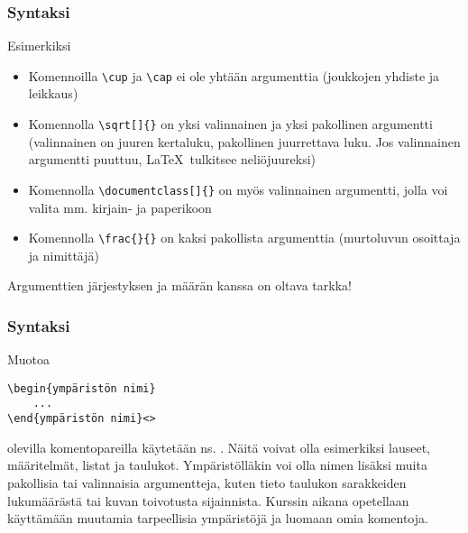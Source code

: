 \begin{fframe}
    \frametitle{Syntaksi}
    Esimerkiksi 
    \begin{itemize}[<+->]
        \item Komennoilla \lstinline-\cup- ja \lstinline-\cap- ei ole yhtään argumenttia (joukkojen yhdiste ja leikkaus)
        \item Komennolla \lstinline-\sqrt[]{}- on yksi valinnainen ja yksi pakollinen argumentti (valinnainen on juuren kertaluku, pakollinen juurrettava luku. Jos valinnainen argumentti puuttuu, \LaTeX\ tulkitsee neliöjuureksi)
        \item Komennolla \lstinline-\documentclass[]{}- on myös valinnainen argumentti, jolla voi valita mm. kirjain- ja paperikoon
        \item Komennolla \lstinline-\frac{}{}- on kaksi pakollista argumenttia (murtoluvun osoittaja ja nimittäjä)
    \end{itemize}
    \pause
    Argumenttien järjestyksen ja määrän kanssa on oltava tarkka!
\end{fframe}

\begin{fframe}
    \frametitle{Syntaksi}
    Muotoa 
    \begin{lstlisting}
\begin{ympäristön nimi}
    ...
\end{ympäristön nimi}<>
    \end{lstlisting}
    olevilla komentopareilla käytetään ns. . \pause Näitä voivat olla esimerkiksi lauseet, määritelmät, listat ja taulukot. \pause
    \vaihto Ympäristölläkin voi olla nimen lisäksi muita pakollisia tai valinnaisia argumentteja, kuten tieto taulukon sarakkeiden lukumäärästä tai kuvan toivotusta sijainnista. \pause
    \vaihto
    Kurssin aikana opetellaan käyttämään muutamia tarpeellisia ympäristöjä ja luomaan omia komentoja.
\end{fframe}

